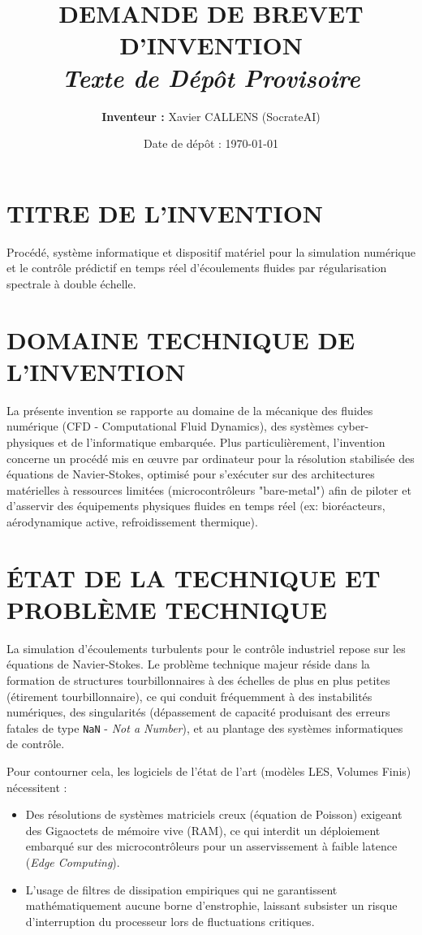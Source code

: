 \documentclass[11pt,a4paper]{article}
\title{\textbf{DEMANDE DE BREVET D'INVENTION}\\ \large \textit{Texte de Dépôt Provisoire}}
\author{\textbf{Inventeur : } Xavier CALLENS (SocrateAI)}
\date{Date de dépôt : \today}
\begin{document}
\maketitle

\section{TITRE DE L'INVENTION}
Procédé, système informatique et dispositif matériel pour la simulation numérique et le contrôle prédictif en temps réel d'écoulements fluides par régularisation spectrale à double échelle.

\section{DOMAINE TECHNIQUE DE L'INVENTION}
La présente invention se rapporte au domaine de la mécanique des fluides numérique (CFD - Computational Fluid Dynamics), des systèmes cyber-physiques et de l'informatique embarquée. Plus particulièrement, l'invention concerne un procédé mis en œuvre par ordinateur pour la résolution stabilisée des équations de Navier-Stokes, optimisé pour s'exécuter sur des architectures matérielles à ressources limitées (microcontrôleurs "bare-metal") afin de piloter et d'asservir des équipements physiques fluides en temps réel (ex: bioréacteurs, aérodynamique active, refroidissement thermique).

\section{ÉTAT DE LA TECHNIQUE ET PROBLÈME TECHNIQUE}
La simulation d'écoulements turbulents pour le contrôle industriel repose sur les équations de Navier-Stokes. Le problème technique majeur réside dans la formation de structures tourbillonnaires à des échelles de plus en plus petites (étirement tourbillonnaire), ce qui conduit fréquemment à des instabilités numériques, des singularités (dépassement de capacité produisant des erreurs fatales de type \texttt{NaN} - \textit{Not a Number}), et au plantage des systèmes informatiques de contrôle.

Pour contourner cela, les logiciels de l'état de l'art (modèles LES, Volumes Finis) nécessitent :
\begin{itemize}
    \item Des résolutions de systèmes matriciels creux (équation de Poisson) exigeant des Gigaoctets de mémoire vive (RAM), ce qui interdit un déploiement embarqué sur des microcontrôleurs pour un asservissement à faible latence (\textit{Edge Computing}).
    \item L'usage de filtres de dissipation empiriques qui ne garantissent mathématiquement aucune borne d'enstrophie, laissant subsister un risque d'interruption du processeur lors de fluctuations critiques.
\end{itemize}
\end{document}

